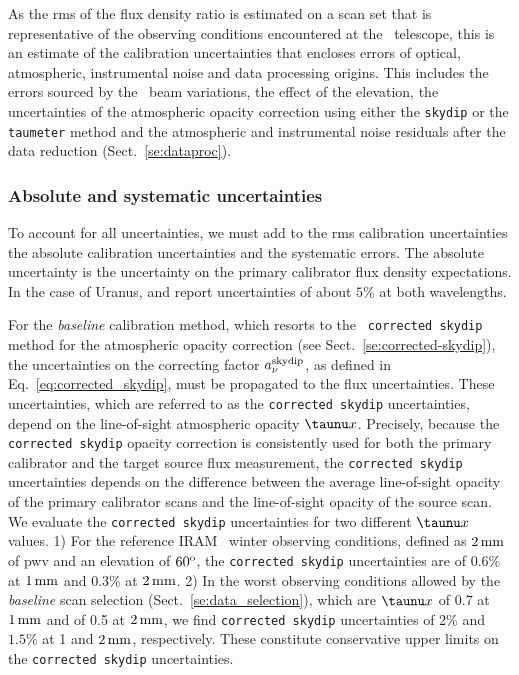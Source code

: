 {\lp As the rms of the flux density ratio is estimated on a scan set
that is representative of the observing conditions encountered at
the \trentemetre\ telescope, this is an estimate of the
calibration uncertainties that encloses errors of
optical, atmospheric, instrumental noise and data processing
origins. This includes the errors sourced by the \afternoon\ beam 
variations, the effect of the elevation, the uncertainties of the
atmospheric opacity correction using either the {\tt skydip} or
the {\tt taumeter} method and the atmospheric and instrumental noise
residuals after the data reduction (Sect.~\ref{se:dataproc}).

\subsubsection{Absolute and systematic uncertainties}
\label{se:def_systematic_errors}

To account for all uncertainties, we must add to the rms calibration
uncertainties the absolute calibration uncertainties and the
systematic errors. The absolute uncertainty is the uncertainty on the
primary calibrator flux density expectations. 
In the case of Uranus, \citet{Morenothesis} and \citet{Bendo2013} report 
uncertainties of about $5\%$ at both wavelengths.

For the \emph{baseline} calibration method, which resorts to the {\tt
corrected skydip} method for the atmospheric opacity correction (see
Sect.~\ref{se:corrected-skydip}), the uncertainties on the
correcting factor $a_\nu^{\rm{skydip}}$, as defined in
Eq.~\ref{eq:corrected_skydip}, must be propagated to the flux
uncertainties. These uncertainties, which are referred to as the
{\tt corrected skydip} uncertainties, depend on the line-of-sight atmospheric
opacity $\taunu x$. Precisely, because the {\tt corrected skydip}
opacity correction is consistently used for both the primary
calibrator and the target source flux measurement, the {\tt corrected skydip}
uncertainties depends on the difference between the average
line-of-sight opacity of the primary calibrator scans and the
line-of-sight opacity of the source scan.   
We evaluate the {\tt corrected skydip} uncertainties for two
different $\taunu x$ values. 1) For the reference IRAM \trentemetre\
winter observing conditions, defined as $2\,\rm{mm}$ of pwv and an
elevation of $60^{\rm{o}}$, the {\tt corrected skydip} uncertainties are of
0.6\% at $1\,\rm{mm}$ and 0.3\% at $2\,\rm{mm}$. 2) In the worst
observing conditions allowed by the \emph{baseline} scan selection
(Sect.~\ref{se:data_selection}),
which are $\taunu x$ of 0.7 at $1\,\rm{mm}$ and of 0.5 at
$2\,\rm{mm}$, we find {\tt corrected skydip} uncertainties of 2\% and
$1.5\%$ at 1 and $2\,\rm{mm}$, respectively. These constitute
conservative upper limits on the {\tt corrected skydip}
uncertainties.

}
